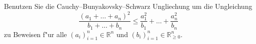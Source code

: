 \documentclass[a4,11pt]{article}
\begin{document}
\begin{aufgabe}[4 Punkte]
Benutzen Sie die Cauchy–Bunyakovsky–Schwarz Ungliechung um die Ungleichung
\[
\frac{(a_1 + \dots +  a_n)^2}{b_1 + \dots + b_n} \leq \frac{a_1^2}{b_1} + \dots + \frac{a_n^2}{b_n}
\]
zu Beweisen f"ur alle $(a_i)_{i = 1}^n \in \mathbb{R}^n$ und $(b_i)_{i=1}^n \in \mathbb{R}^n_{\geq 0}$.
\end{aufgabe}
\end{document}
